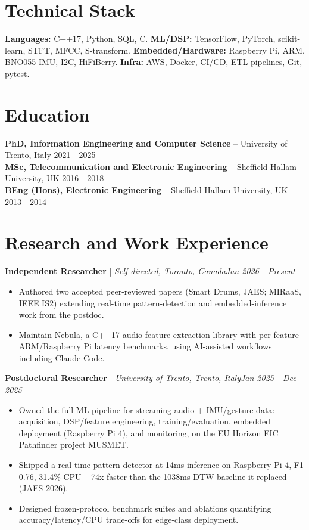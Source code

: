 \documentclass[11pt]{article}
\newenvironment{cvrole}[5]{%
  \par\noindent\textbf{\large #1} | \textit{\small #2, #3}\hfill \textit{\small #4 - #5}\par
  \begin{itemize}[leftmargin=2em, itemsep=-0.3em, topsep=-0.5em]%
}{%
  \end{itemize}\par\noindent\mbox{}\par\vspace{0.1em}%
}
\begin{document}
\section*{Technical Stack}
\textbf{Languages:} C++17, Python, SQL, C. \quad
\textbf{ML/DSP:} TensorFlow, PyTorch, scikit-learn, STFT, MFCC, S-transform. \quad
\textbf{Embedded/Hardware:} Raspberry Pi, ARM, BNO055 IMU, I2C, HiFiBerry. \quad
\textbf{Infra:} AWS, Docker, CI/CD, ETL pipelines, Git, pytest.

\section*{Education}
\noindent\textbf{PhD, Information Engineering and Computer Science} -- University of Trento, Italy \hfill 2021 - 2025 \\
\noindent\textbf{MSc, Telecommunication and Electronic Engineering} -- Sheffield Hallam University, UK \hfill 2016 - 2018 \\
\noindent\textbf{BEng (Hons), Electronic Engineering} -- Sheffield Hallam University, UK \hfill 2013 - 2014

\section*{Research and Work Experience}

\begin{cvrole}{Independent Researcher}{Self-directed}{Toronto, Canada}{Jan 2026}{Present}
  \item Authored two accepted peer-reviewed papers (Smart Drums, JAES; MIRaaS, IEEE IS2) extending real-time pattern-detection and embedded-inference work from the postdoc.
  \item Maintain Nebula, a C++17 audio-feature-extraction library with per-feature ARM/Raspberry Pi latency benchmarks, using AI-assisted workflows including Claude Code.
\end{cvrole}

\begin{cvrole}{Postdoctoral Researcher}{University of Trento}{Trento, Italy}{Jan 2025}{Dec 2025}
  \item Owned the full ML pipeline for streaming audio + IMU/gesture data: acquisition, DSP/feature engineering, training/evaluation, embedded deployment (Raspberry Pi 4), and monitoring, on the EU Horizon EIC Pathfinder project MUSMET.
  \item Shipped a real-time pattern detector at 14ms inference on Raspberry Pi 4, F1 0.76, 31.4\% CPU -- 74x faster than the 1038ms DTW baseline it replaced (JAES 2026).
  \item Designed frozen-protocol benchmark suites and ablations quantifying accuracy/latency/CPU trade-offs for edge-class deployment.
\end{cvrole}
\end{document}
